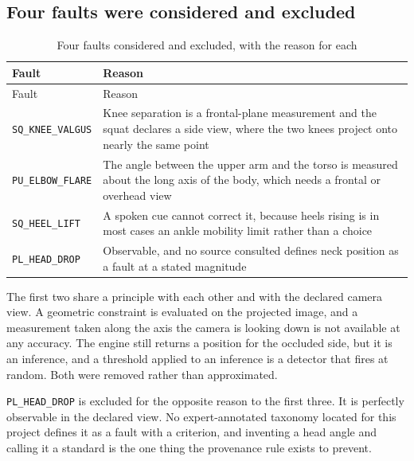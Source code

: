 \subsection{Four faults were considered and excluded}
\label{sec:6.4.4}

{\small
\setlength{\LTpre}{6pt}\setlength{\LTpost}{8pt}
\begin{longtable}{>{\raggedright\arraybackslash}p{}>{\raggedright\arraybackslash}p{}}
\caption{Four faults considered and excluded, with the reason for each}\\
\toprule
Fault & Reason \\
\midrule
\endfirsthead
\toprule
Fault & Reason \\
\midrule
\endhead
\bottomrule
\endfoot
\bottomrule
\endlastfoot
\texttt{SQ\_\allowbreak{}KNEE\_\allowbreak{}VALGUS} & Knee separation is a frontal-plane measurement and the squat declares a side view, where the two knees project onto nearly the same point \\
\texttt{PU\_\allowbreak{}ELBOW\_\allowbreak{}FLARE} & The angle between the upper arm and the torso is measured about the long axis of the body, which needs a frontal or overhead view \\
\texttt{SQ\_\allowbreak{}HEEL\_\allowbreak{}LIFT} & A spoken cue cannot correct it, because heels rising is in most cases an ankle mobility limit rather than a choice \\
\texttt{PL\_\allowbreak{}HEAD\_\allowbreak{}DROP} & Observable, and no source consulted defines neck position as a fault at a stated magnitude \\
\end{longtable}
}

The first two share a principle with each other and with the declared camera view. A geometric constraint is evaluated on the projected image, and a measurement taken along the axis the camera is looking down is not available at any accuracy. The engine still returns a position for the occluded side, but it is an inference, and a threshold applied to an inference is a detector that fires at random. Both were removed rather than approximated.

\texttt{PL\_\allowbreak{}HEAD\_\allowbreak{}DROP} is excluded for the opposite reason to the first three. It is perfectly observable in the declared view. No expert-annotated taxonomy located for this project defines it as a fault with a criterion, and inventing a head angle and calling it a standard is the one thing the provenance rule exists to prevent.

